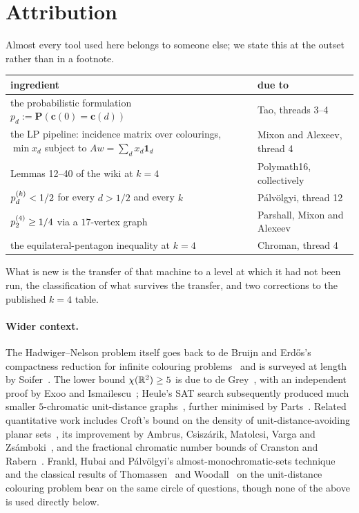 \section{Attribution}

Almost every tool used here belongs to someone else; we state this at the outset
rather than in a footnote.

\begin{center}
\begin{tabular}{@{}p{7.4cm}l@{}}
\toprule
ingredient & due to \\
\midrule
the probabilistic formulation $p_d:=\mathbf{P}(\mathbf{c}(0)=\mathbf{c}(d))$
& Tao, threads 3--4~\cite{Polymath16} \\
the LP pipeline: incidence matrix over colourings, $\min x_d$ subject to
$Aw=\sum_d x_d\mathbf{1}_d$ & Mixon and Alexeev, thread 4~\cite{Polymath16} \\
Lemmas 12--40 of the wiki at $k=4$ & Polymath16, collectively~\cite{Polymath16} \\
$p^{(k)}_{d}<1/2$ for every $d>1/2$ and every $k$ & P\'alv\"olgyi, thread 12~\cite{Polymath16} \\
$p^{(4)}_{2}\ge 1/4$ via a $17$-vertex graph & Parshall, Mixon and Alexeev~\cite{Polymath16} \\
the equilateral-pentagon inequality at $k=4$ & Chroman, thread 4~\cite{Polymath16} \\
\bottomrule
\end{tabular}
\end{center}

What is new is the transfer of that machine to a level at which it had not been
run, the classification of what survives the transfer, and two corrections to
the published $k=4$ table.

\paragraph{Wider context.} The Hadwiger--Nelson problem itself goes back to
de Bruijn and Erd\H{o}s's compactness reduction for infinite colouring
problems~\cite{deBruijnErdos1951} and is surveyed at length by
Soifer~\cite{Soifer2008}. The lower bound $\chi(\mathbb{R}^2)\ge5$ is due to
de Grey~\cite{deGrey2018}, with an independent proof by Exoo and
Ismailescu~\cite{ExooIsmailescu2018a}; Heule's SAT search subsequently produced
much smaller $5$-chromatic unit-distance graphs~\cite{Heule2018}, further
minimised by Parts~\cite{Parts2020}. Related quantitative work includes Croft's
bound on the density of unit-distance-avoiding planar sets~\cite{Croft1967}, its
improvement by Ambrus, Csisz\'arik, Matolcsi, Varga and
Zsámboki~\cite{Ambrus2022}, and the fractional chromatic number bounds of
Cranston and Rabern~\cite{CranstonRabern2015}. Frankl, Hubai and
P\'alv\"olgyi's almost-monochromatic-sets technique~\cite{FranklHubaiPalvolgyi2019}
and the classical results of Thomassen~\cite{Thomassen1999} and
Woodall~\cite{Woodall1973} on the unit-distance colouring problem bear on the
same circle of questions, though none of the above is used directly below.

